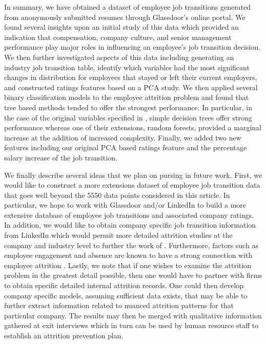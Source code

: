 \documentclass[10pt]{article}
\begin{document}
In summary, we have obtained a dataset of employee job transitions generated from 
anonymously submitted resumes through Glassdoor's online portal. We found several 
insights upon an initial study of this data which provided an indication that 
compensation, company culture, and senior management performance play major 
roles in influencing an employee's job transition decision.  We then further investigated 
aspects of this data including generating an industry job transition table, identify 
which variables had the most significant changes in distribution for employees 
that stayed or left their current employers, and constructed ratings features 
based on a PCA study. We then applied several binary classification models 
to the employee attrition problem and found that tree based methods tended to 
offer the strongest performance.  In particular, in the case of the original 
variables specified in \cite{Smart2016}, simple decision trees offer strong 
performance whereas one of their extensions, random forests, provided a 
marginal increase at the addition of increased complexity.  Finally, we added 
two new features including our original PCA based ratings feature
and the percentage salary increase of the job transition.  

We finally describe several ideas that we plan on pursing in future work.  First, 
we would like to construct a more extensions dataset of employee job transition data that goes
well beyond the 5550 data points considered in this article.  In particular, 
we hope to work with Glassdoor and/or LinkedIn to build a more extensive database of 
employee job transitions and associated company ratings. In addition, we would like to 
obtain company specific job transition information from LinkedIn which would permit 
more detailed attrition studies at the company and industry level to further 
the work of \cite{Bennet1993}.  Furthermore, factors such as employee 
engagement and absence are known to have a strong connection with employee attrition 
\cite{Kumar2015,Mitra1992}.  Lastly, we 
note that if one wishes to examine the attrition problem in the greatest detail 
possible, then one would have to partner with firms to obtain specific detailed 
internal attrition records.  One could then develop company specific models, 
assuming sufficient data exists, that may be able to further extract information 
related to nuanced attrition patterns for that particular company.  The results 
may then be merged with qualitative information gathered at exit interviews which  
in turn can be used by human resource staff to establish an attrition prevention plan. 
\end{document}
